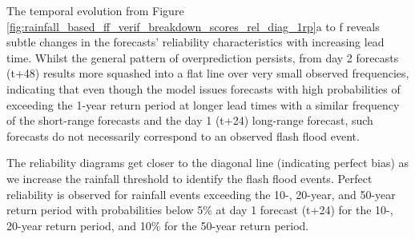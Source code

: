 The temporal evolution from Figure \ref{fig:rainfall_based_ff_verif_breakdown_scores_rel_diag_1rp}a to f reveals subtle changes in the forecasts' reliability characteristics with increasing lead time. Whilst the general pattern of overprediction persists, from day 2 forecasts (t+48) results more squashed into a flat line over very small observed frequencies, indicating that even though the model issues forecasts with high probabilities of exceeding the 1-year return period at longer lead times with a similar frequency of the short-range forecasts and the day 1 (t+24) long-range forecast, such forecasts do not necessarily correspond to an observed flash flood event.

The reliability diagrams get closer to the diagonal line (indicating perfect bias) as we increase the rainfall threshold to identify the flash flood events. Perfect reliability is observed for rainfall events exceeding the 10-, 20-year, and 50-year return period with probabilities below 5\% at day 1 forecast (t+24) for the 10-, 20-year return period, and 10\% for the 50-year return period.

